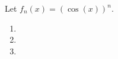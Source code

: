 Let $f_n(x)=(\cos(x))^n$.

\begin{enumerate}

    \item 
    \pagebreak
    \item 
    \pagebreak
    \item 

\end{enumerate}